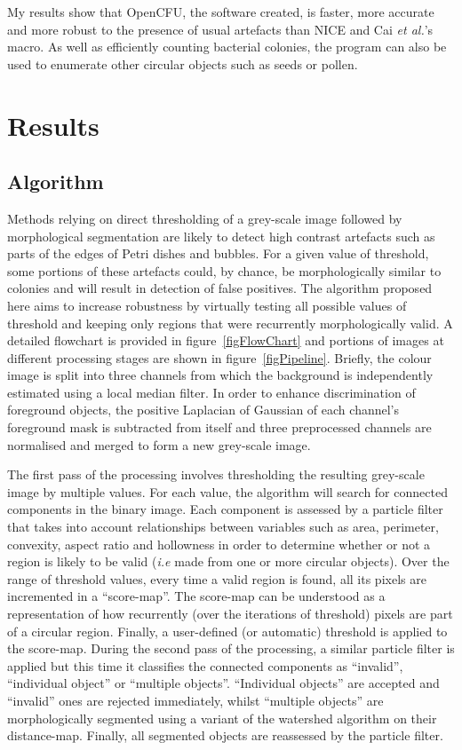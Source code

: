 \documentclass[10pt]{article}
\begin{document}
My results show that OpenCFU, the software created, is faster, more accurate and
more robust to the presence of usual artefacts than NICE and Cai \emph{et al.}'s macro.
As well as efficiently counting
bacterial colonies, the program can also 
be used to enumerate
other circular objects such as seeds or pollen. 


\section*{Results}


\subsection*{Algorithm} 
Methods relying on direct thresholding of a grey-scale image followed
by morphological segmentation are likely to detect high contrast artefacts such
as parts of the edges of Petri dishes and bubbles.  For a given value of threshold,
some portions of these artefacts could, by chance, be morphologically similar to colonies and will result in
detection of false positives.
The algorithm proposed here aims to increase robustness by virtually testing
all possible values of threshold and keeping only regions that were recurrently morphologically
valid. A detailed flowchart is provided in figure~\ref{figFlowChart} and portions of images 
at different processing stages are shown in figure~\ref{figPipeline}.
Briefly, the colour image is split into three channels from which the background
is independently estimated using a local median filter.
In order to enhance discrimination of foreground objects,  the positive
Laplacian of Gaussian of each channel's foreground mask is subtracted from
itself and three preprocessed channels are normalised and merged to form a
new grey-scale image.

The first pass of the processing involves thresholding the resulting grey-scale
image by multiple values.
For each value, the algorithm will search for connected components in the binary
image.
Each component is assessed by a particle filter that takes into account relationships
between variables such as area, perimeter, convexity, aspect ratio and
hollowness in order to determine whether or not a region is likely to be valid 
(\emph{i.e} made from one or more circular objects).
Over the range of threshold values, every time a valid region is found, all
its pixels are incremented in a ``score-map''.
The score-map can be understood as a representation of how recurrently (over the
iterations of threshold) pixels are part of a circular region. Finally,  a
user-defined (or automatic) threshold is applied to the score-map.
During the second pass of the processing, a similar particle filter is applied
but this time it classifies the connected components as ``invalid'',
``individual object'' or ``multiple objects''.
``Individual objects'' are accepted and ``invalid'' ones  are rejected
immediately, whilst ``multiple objects'' are morphologically segmented using a variant
of the watershed algorithm on their distance-map\cite{marotz_effective_2001}.
Finally, all segmented objects are reassessed by the particle filter.
\end{document}

